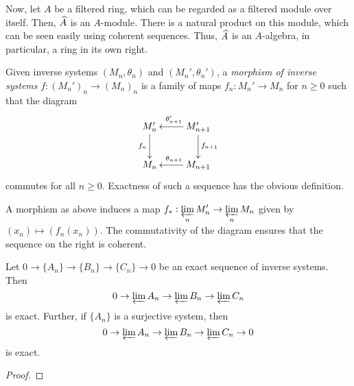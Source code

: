 Now, let $A$ be a filtered ring, which can be regarded as a filtered module over itself. Then, $\widehat{A}$ is an $A$-module. There is a natural product on this module, which can be seen easily using coherent sequences. Thus, $\widehat{A}$ is an $A$-algebra, in particular, a ring in its own right.

\begin{definition}
    Given inverse systems $(M_n,\theta_n)$ and $(M_n',\theta_n')$, a \emph{morphism of inverse systems} $f: (M_n')_n\to (M_n)_n$ is a family of maps $f_n: M_n'\to M_n$ for $n\ge 0$ such that the diagram 
    \begin{equation*}
        \xymatrix {
            M_n'\ar[d]_{f_n} & M_{n + 1}'\ar[d]^{f_{n + 1}}\ar[l]_{\theta_{n + 1}'}\\
            M_n & M_{n + 1}\ar[l]_{\theta_{n + 1}}
        }
    \end{equation*}
    commutes for all $n\ge 0$. Exactness of such a sequence has the obvious definition.
\end{definition}

A morphism as above induces a map $\displaystyle f_\ast: \varprojlim_n M_n'\to\varprojlim_n M_n$ given by $(x_n)\mapsto (f_n(x_n))$. The commutativity of the diagram ensures that the sequence on the right is coherent.

\begin{proposition}
    Let $0\to\{A_n\}\to\{B_n\}\to\{C_n\}\to0$ be an exact sequence of inverse systems. Then 
    \begin{equation*}
        0\to\varprojlim A_n\to\varprojlim B_n\to\varprojlim C_n
    \end{equation*}
    is exact. Further, if $\{A_n\}$ is a surjective system, then 
    \begin{equation*}
        0\to\varprojlim A_n\to\varprojlim B_n\to\varprojlim C_n\to 0
    \end{equation*}
    is exact.
\end{proposition}
\begin{proof}
\end{proof}